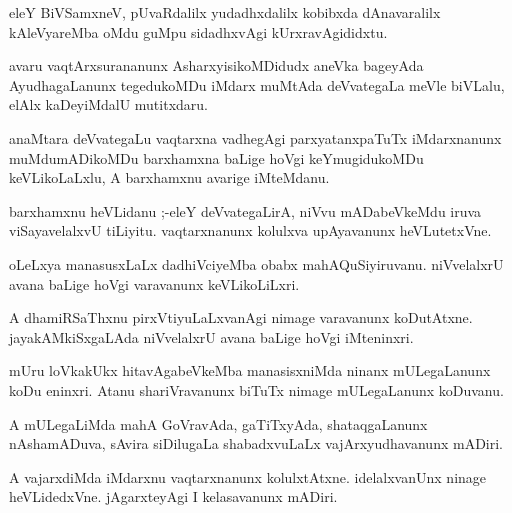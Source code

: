 \documentclass{article}
\begin{document}
\begin{mn}
eleY  BiVSamxneV,  pUvaRdalilx  yudadhxdalilx  kobibxda  dAnavaralilx  
kAleVyareMba  oMdu  guMpu  sidadhxvAgi  kUrxravAgididxtu. 
\end{mn}

\begin{mn}
avaru  vaqtArxsurananunx  AsharxyisikoMDidudx  aneVka bageyAda  AyudhagaLanunx  
tegedukoMDu  iMdarx  muMtAda  deVvategaLa  meVle  biVLalu,  elAlx  kaDeyiMdalU  mutitxdaru.
\end{mn}

\begin{mn}
anaMtara  deVvategaLu  vaqtarxna  vadhegAgi  parxyatanxpaTuTx  iMdarxnanunx  muMdumADikoMDu  
barxhamxna  baLige  hoVgi  keYmugidukoMDu  keVLikoLaLxlu,  A  barxhamxnu  avarige  iMteMdanu.
\end{mn}

\begin{mn}
barxhamxnu  heVLidanu ;-eleY  deVvategaLirA,  niVvu  mADabeVkeMdu  iruva  viSayavelalxvU  
tiLiyitu.  vaqtarxnanunx  kolulxva  upAyavanunx  heVLutetxVne.
\end{mn}

\begin{mn}
oLeLxya manasusxLaLx  dadhiVciyeMba  obabx  mahAQuSiyiruvanu.  niVvelalxrU  
avana  baLige  hoVgi  varavanunx  keVLikoLiLxri.
\end{mn}

\begin{mn}
A  dhamiRSaThxnu  pirxVtiyuLaLxvanAgi  nimage  varavanunx  koDutAtxne.  
jayakAMkiSxgaLAda  niVvelalxrU  avana  baLige  hoVgi  iMteninxri.
\end{mn}

\begin{mn}
mUru  loVkakUkx  hitavAgabeVkeMba  manasisxniMda  ninanx  mULegaLanunx  koDu  
eninxri.  Atanu  shariVravanunx  biTuTx  nimage  mULegaLanunx  koDuvanu.
\end{mn}

\begin{mn}
A  mULegaLiMda  mahA  GoVravAda,  gaTiTxyAda,  shataqgaLanunx  nAshamADuva,  
sAvira  siDilugaLa  shabadxvuLaLx  vajArxyudhavanunx  mADiri. 
\end{mn}

\begin{mn}
A  vajarxdiMda  iMdarxnu  vaqtarxnanunx  kolulxtAtxne.  idelalxvanUnx  ninage  
heVLidedxVne.  jAgarxteyAgi  I  kelasavanunx  mADiri.
\end{mn}
\end{document}
